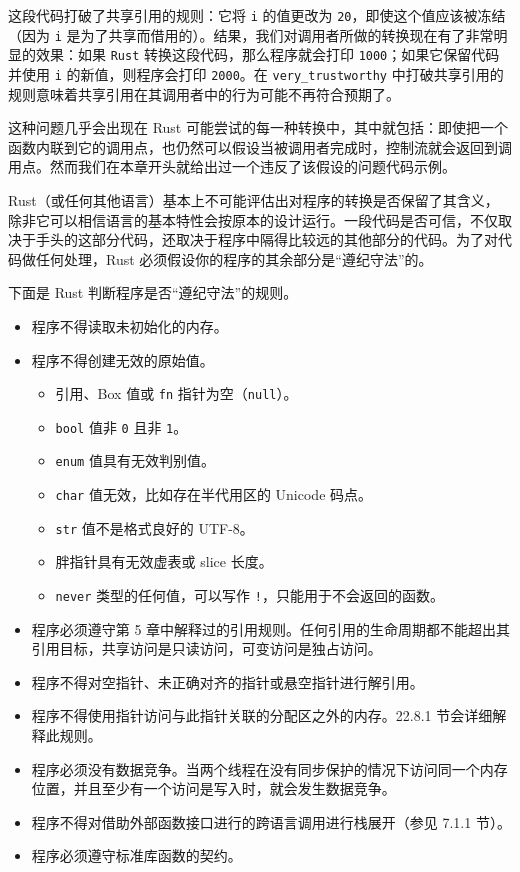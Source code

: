 这段代码打破了共享引用的规则：它将 \texttt{i} 的值更改为 \texttt{20}，即使这个值应该被冻结（因为 \texttt{i} 是为了共享而借用的）。结果，我们对调用者所做的转换现在有了非常明显的效果：如果 \texttt{Rust} 转换这段代码，那么程序就会打印 \texttt{1000}；如果它保留代码并使用 \texttt{i} 的新值，则程序会打印 \texttt{2000}。在 \texttt{very\_trustworthy} 中打破共享引用的规则意味着共享引用在其调用者中的行为可能不再符合预期了。

这种问题几乎会出现在 Rust 可能尝试的每一种转换中，其中就包括：即使把一个函数内联到它的调用点，也仍然可以假设当被调用者完成时，控制流就会返回到调用点。然而我们在本章开头就给出过一个违反了该假设的问题代码示例。

Rust（或任何其他语言）基本上不可能评估出对程序的转换是否保留了其含义，除非它可以相信语言的基本特性会按原本的设计运行。一段代码是否可信，不仅取决于手头的这部分代码，还取决于程序中隔得比较远的其他部分的代码。为了对代码做任何处理，Rust 必须假设你的程序的其余部分是“遵纪守法”的。

下面是 Rust 判断程序是否“遵纪守法”的规则。

\begin{itemize}
\item 程序不得读取未初始化的内存。
\item 程序不得创建无效的原始值。

\begin{itemize}
\item 引用、Box 值或 \texttt{fn} 指针为空（\texttt{null}）。
\item \texttt{bool} 值非 \texttt{0} 且非 \texttt{1}。
\item \texttt{enum} 值具有无效判别值。
\item \texttt{char} 值无效，比如存在半代用区的 Unicode 码点。
\item \texttt{str} 值不是格式良好的 UTF-8。
\item 胖指针具有无效虚表或 slice 长度。
\item \texttt{never} 类型的任何值，可以写作 \texttt{!}，只能用于不会返回的函数。
\end{itemize}

\item 程序必须遵守第 5 章中解释过的引用规则。任何引用的生命周期都不能超出其引用目标，共享访问是只读访问，可变访问是独占访问。
\item 程序不得对空指针、未正确对齐的指针或悬空指针进行解引用。
\item 程序不得使用指针访问与此指针关联的分配区之外的内存。22.8.1 节会详细解释此规则。
\item 程序必须没有数据竞争。当两个线程在没有同步保护的情况下访问同一个内存位置，并且至少有一个访问是写入时，就会发生数据竞争。
\item 程序不得对借助外部函数接口进行的跨语言调用进行栈展开（参见 7.1.1 节）。
\item 程序必须遵守标准库函数的契约。
\end{itemize}

